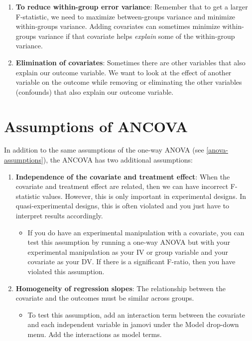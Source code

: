 \documentclass[
]{book}
\providecommand{\tightlist}{%
  \setlength{\itemsep}{0pt}\setlength{\parskip}{0pt}}
\begin{document}
\begin{enumerate}
\def\labelenumi{\arabic{enumi}.}
\item
  \textbf{To reduce within-group error variance}: Remember that to get a larger F-statistic, we need to maximize between-groups variance and minimize within-groups variance. Adding covariates can sometimes minimize within-groups variance if that covariate helps \emph{explain} some of the within-group variance.
\item
  \textbf{Elimination of covariates}: Sometimes there are other variables that also explain our outcome variable. We want to look at the effect of another variable on the outcome while removing or eliminating the other variables (confounds) that also explain our outcome variable.
\end{enumerate}

\hypertarget{assumptions-of-ancova}{%
\section{Assumptions of ANCOVA}\label{assumptions-of-ancova}}

In addition to the same assumptions of the one-way ANOVA (see \ref{anova-assumptions}), the ANCOVA has two additional assumptions:

\begin{enumerate}
\def\labelenumi{\arabic{enumi}.}
\item
  \textbf{Independence of the covariate and treatment effect}: When the covariate and treatment effect are related, then we can have incorrect F-statistic values. However, this is only important in experimental designs. In quasi-experimental designs, this is often violated and you just have to interpret results accordingly.

  \begin{itemize}
  \tightlist
  \item
    If you do have an experimental manipulation with a covariate, you can test this assumption by running a one-way ANOVA but with your experimental manipulation as your IV or group variable and your covariate as your DV. If there is a significant F-ratio, then you have violated this assumption.
  \end{itemize}
\item
  \textbf{Homogeneity of regression slopes}: The relationship between the covariate and the outcomes must be similar across groups.

  \begin{itemize}
  \tightlist
  \item
    To test this assumption, add an interaction term between the covariate and each independent variable in jamovi under the Model drop-down menu. Add the interactions as model terms.
  \end{itemize}
\end{enumerate}
\end{document}

